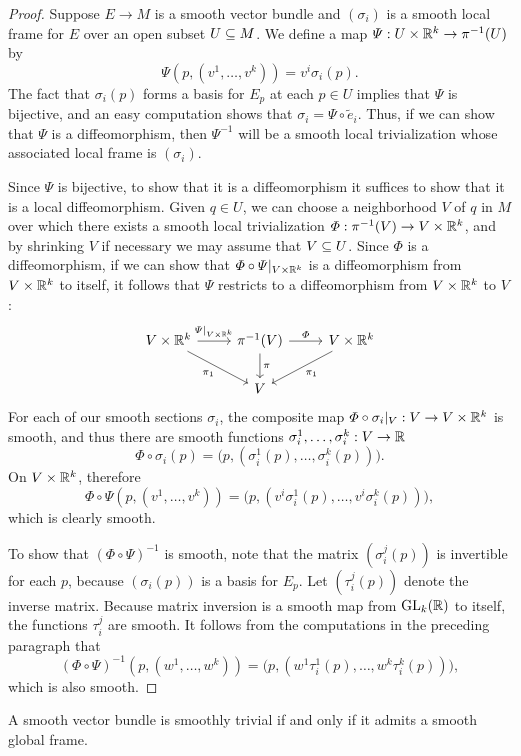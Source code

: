 \begin{proof}
Suppose $E\to M$ is a smooth vector bundle and $(\sigma_i)$ is a smooth local frame for $E$ over an open subset $U\subseteq M$. We define a map $\varPsi:U\times\mathbb{R}^k\to\pi^{-1}(U)$ by
\[\varPsi(p,(v^1,\dots,v^k))=v^i\sigma_i(p).\]
The fact that $\sigma_i(p)$ forms a basis for $E_p$ at each $p\in U$ implies that $\varPsi$ is bijective, and an easy computation shows that $\sigma_i=\varPsi\circ\widetilde{e}_i$. Thus, if we can show that $\varPsi$ is
a diffeomorphism, then $\varPsi^{-1}$ will be a smooth local trivialization whose associated local frame is $(\sigma_i)$.\par
Since $\varPsi$ is bijective, to show that it is a diffeomorphism it suffices to show that it is a local diffeomorphism. Given $q\in U$, we can choose a neighborhood $V$ of $q$ in $M$ over which there exists a smooth local trivialization $\varPhi:\pi^{-1}(V)\to V\times\mathbb{R}^k$, and by shrinking $V$ if necessary we may assume that $V\subseteq U$. Since $\varPhi$ is a diffeomorphism, if we can show that $\varPhi\circ\varPsi|_{V\times\mathbb{R}^k}$ is a diffeomorphism from $V\times\mathbb{R}^k$ to itself, it follows that $\varPsi$ restricts to a diffeomorphism from $V\times\mathbb{R}^k$ to $V$:
\[\begin{tikzcd}
V\times\R^k\ar[rd,swap,"\pi_1"]\ar[r,"\varPsi|_{V\times\R^k}"]&\pi^{-1}(V)\ar[d,"\pi"]\ar[r,"\varPhi"]&V\times\R^k\ar[ld,"\pi_1"]\\
&V&
\end{tikzcd}\]
For each of our smooth sections $\sigma_i$, the composite map $\varPhi\circ\sigma_i|_V:V\to V\times\mathbb{R}^k$ is smooth, and thus there are smooth functions $\sigma_i^1,\dots,\sigma_i^k:V\to\mathbb{R}$
\[\varPhi\circ\sigma_i(p)=\big(p,(\sigma_i^1(p),\dots,\sigma_i^k(p))\big).\]
On $V\times\mathbb{R}^k$, therefore
\[\varPhi\circ\varPsi(p,(v^1,\dots,v^k))=\big(p,(v^i\sigma_i^1(p),\dots,v^i\sigma_i^k(p))\big),\]
which is clearly smooth.\par
To show that $(\varPhi\circ\varPsi)^{-1}$ is smooth, note that the matrix $(\sigma_i^j(p))$ is invertible for each $p$, because $(\sigma_i(p))$ is a basis for $E_p$. Let $(\tau_i^j(p))$ denote the inverse matrix. Because matrix inversion is a smooth map from $\mathrm{GL}_k(\mathbb{R})$ to itself, the functions $\tau_i^j$ are smooth. It follows from the computations in the preceding paragraph that
\[(\varPhi\circ\varPsi)^{-1}(p,(w^1,\dots,w^k))=\big(p,(w^1\tau_i^1(p),\dots,w^k\tau_i^k(p))\big),\]
which is also smooth.
\end{proof}
\begin{corollary}
A smooth vector bundle is smoothly trivial if and only if it admits a smooth global frame.
\end{corollary}
